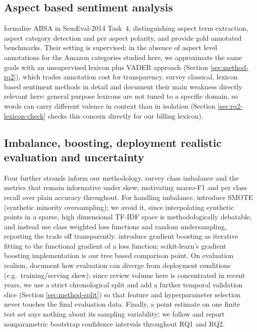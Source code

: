 \documentclass[11pt,a4paper,DIV=12]{scrartcl}
\begin{document}
\subsection{Aspect based sentiment analysis}
\citet{pontiki2014semeval} formalise ABSA in SemEval-2014 Task~4, distinguishing
aspect term extraction, aspect category detection and per aspect polarity, and
provide gold annotated benchmarks. Their setting is supervised; in the absence of
aspect level annotations for the Amazon categories studied here, we approximate
the same goals with an unsupervised lexicon plus VADER approach (Section
\ref{sec:method-rq2}), which trades annotation cost for transparency.
\citet{taboada2011lexicon} survey classical, lexicon based sentiment methods in
detail and document their main weakness directly relevant here: general purpose
lexicons are not tuned to a specific domain, so words can carry different
valence in context than in isolation (Section \ref{sec:rq2-lexicon-check}
checks this concern directly for our billing lexicon).

\subsection{Imbalance, boosting, deployment realistic evaluation and uncertainty}
\label{sec:related-imbalance}
Four further strands inform our methodology. \citet{he2009imbalanced} survey
class imbalance and the metrics that remain informative under skew, motivating
macro-F1 and per class recall over plain accuracy throughout. For handling
imbalance, \citet{chawla2002smote} introduce SMOTE (synthetic minority
oversampling); we avoid it, since interpolating synthetic points in a sparse,
high dimensional TF-IDF space is methodologically debatable, and instead use
class weighted loss functions and random undersampling, reporting the
trade off transparently. \citet{friedman2001greedy} introduce gradient
boosting as iterative fitting to the functional gradient of a loss function;
scikit-learn's gradient boosting implementation \citep{pedregosa2011scikit}
is our tree based comparison point. On evaluation realism,
\citet{sculley2015hidden} document how evaluation can diverge from deployment
conditions (e.g.\ training/serving skew); since review volume here is
concentrated in recent years, we use a strict chronological split and add a
further temporal validation slice (Section \ref{sec:method-split}) so that
feature and hyperparameter selection never touches the final evaluation data.
Finally, a point estimate on one finite test set says nothing about its
sampling variability; we follow \citet{efron1993bootstrap} and report
nonparametric bootstrap confidence intervals throughout RQ1 and RQ2.
\end{document}
